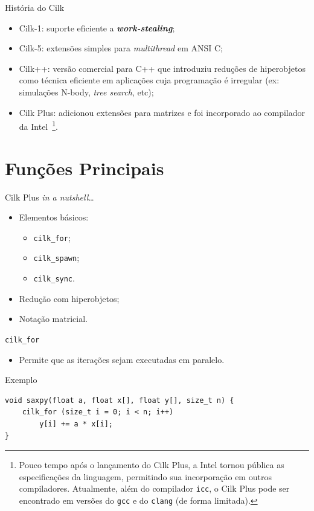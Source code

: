 \documentclass{beamer}
\begin{document}
\begin{frame}{História do Cilk}
\begin{itemize}
    \item Cilk-1: suporte eficiente a \textbf{\textit{work-stealing}};
    \item Cilk-5: extensões simples para \textit{multithread} em ANSI C\@;
    \item Cilk++: versão comercial para C++ que introduziu reduções de
    hiperobjetos como técnica eficiente em aplicações cuja programação é
    irregular (ex: simulações N-body, \textit{tree search}, etc);
    \item Cilk Plus: adicionou extensões para matrizes e foi incorporado ao
    compilador da Intel~\footnote{Pouco tempo após o lançamento do Cilk Plus, a
    Intel tornou pública as especificações da linguagem, permitindo sua
    incorporação em outros compiladores. Atualmente, além do compilador
    \texttt{icc}, o Cilk Plus pode ser encontrado em versões do \texttt{gcc} e
    do \texttt{clang} (de forma limitada).}.
\end{itemize}
\end{frame}

\section{Funções Principais}
\begin{frame}{Cilk Plus \textit{in a nutshell}\ldots}
\begin{itemize}
    \item Elementos básicos:
    \begin{itemize}
        \item \texttt{cilk\_for};
        \item \texttt{cilk\_spawn};
        \item \texttt{cilk\_sync}.
    \end{itemize}
    \item Redução com hiperobjetos;
    \item Notação matricial.
\end{itemize}
\end{frame}

\begin{frame}[fragile]{\texttt{cilk\_for}}
\begin{itemize}
    \item Permite que as iterações sejam executadas em paralelo.
\end{itemize}
\begin{exampleblock}{Exemplo}
\begin{lstlisting}
void saxpy(float a, float x[], float y[], size_t n) {
    cilk_for (size_t i = 0; i < n; i++)
        y[i] += a * x[i];
}
\end{lstlisting}
\end{exampleblock}
\end{frame}
\end{document}
